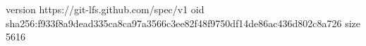 version https://git-lfs.github.com/spec/v1
oid sha256:f933f8a9dead335ca8ca97a3566c3ee82f48f9750df14de86ac436d802c8a726
size 5616
